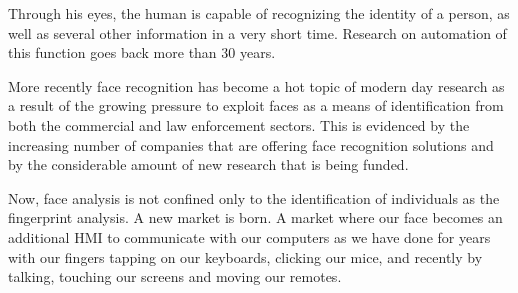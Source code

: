 Through his eyes, the human is capable of recognizing the identity of a person, as well as several other information in a very short time. Research on automation of this function goes back more than 30 years.

More recently face recognition has become a hot topic of modern day research as a result of the growing pressure to exploit faces as a means of identification from both the commercial and law enforcement sectors.
This is evidenced by the
increasing number of companies that are offering face recognition solutions and by the considerable
amount of new research that is being funded.

Now, face analysis is not confined only to the identification of individuals as the fingerprint analysis. A new market is born. A market where our face becomes an additional HMI to communicate with our computers as we have done for years with our fingers tapping on our keyboards, clicking our mice, and recently by talking, touching our screens and moving our remotes.
